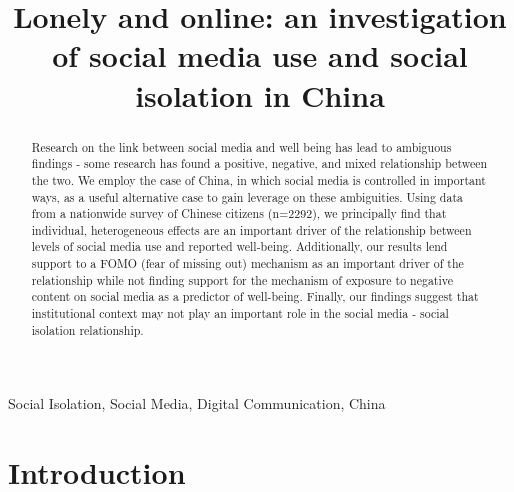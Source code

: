 \documentclass[]{interact}
\theoremstyle{plain}%
\theoremstyle{definition}
\theoremstyle{remark}
\begin{document}
\title{Lonely and online: an investigation of social media use and
social isolation in China}



\author{
}

\maketitle

\begin{abstract}
Research on the link between social media and well being has lead to
ambiguous findings - some research has found a positive, negative, and
mixed relationship between the two. We employ the case of China, in
which social media is controlled in important ways, as a useful
alternative case to gain leverage on these ambiguities. Using data from
a nationwide survey of Chinese citizens (n=2292), we principally find
that individual, heterogeneous effects are an important driver of the
relationship between levels of social media use and reported well-being.
Additionally, our results lend support to a FOMO (fear of missing out)
mechanism as an important driver of the relationship while not finding
support for the mechanism of exposure to negative content on social
media as a predictor of well-being. Finally, our findings suggest that
institutional context may not play an important role in the social media
- social isolation relationship.
\end{abstract}

\begin{keywords}
    Social Isolation, Social Media, Digital Communication, 
    China
\end{keywords}\ifdefined\Shaded\renewenvironment{Shaded}{\begin{tcolorbox}[borderline west={3pt}{0pt}{shadecolor}, enhanced, interior hidden, breakable, sharp corners, boxrule=0pt, frame hidden]}{\end{tcolorbox}}\fi

\newpage{}

\hypertarget{introduction}{%
\section{Introduction}\label{introduction}}
\end{document}
